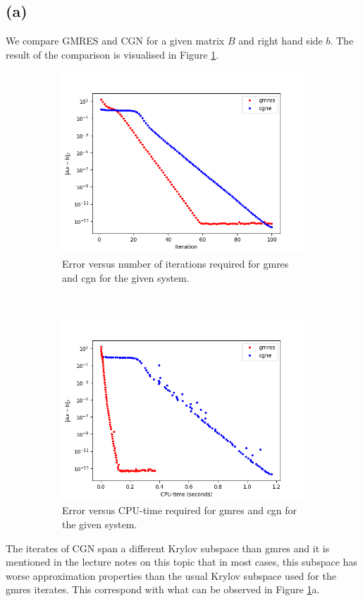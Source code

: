 \subsection*{(a)}
We compare GMRES and CGN for a given matrix $B$ and right hand side $b$. The result of the comparison is visualised in Figure \ref{task6}.
\begin{figure}[h!]
	\centering
	\begin{subfigure}[t]{0.49\textwidth}
		\includegraphics[width=\textwidth]{error_itr.png}
		\caption{Error versus number of iterations required for gmres and cgn for the given system.}
	\end{subfigure}~
	\begin{subfigure}[t]{0.49\textwidth}
		\includegraphics[width=\textwidth]{error_time.png}
		\caption{Error versus CPU-time required for gmres and cgn for the given system.}
	\end{subfigure}
	\caption{}
	\label{task6}
\end{figure}
The iterates of CGN span a different Krylov subspace than gmres and it is mentioned in the lecture notes on this topic that in most cases, this subspace has worse approximation properties than the usual Krylov subspace used for the gmres iterates. This correspond with what can be observed in Figure \ref{task6}a.
